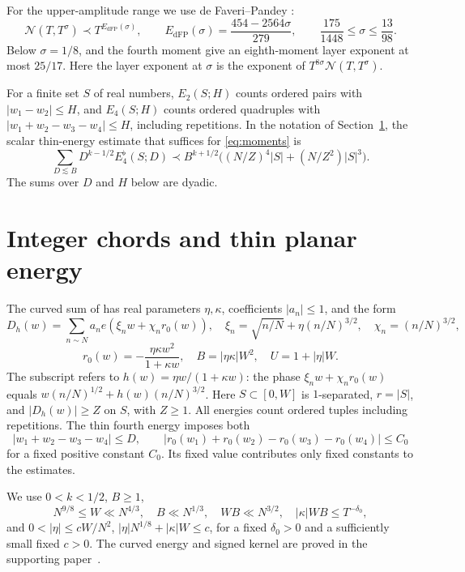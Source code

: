 \documentclass[11pt]{amsart}
\numberwithin{equation}{section}
\newcommand{\cN}{\mathcal N}
\begin{document}
For the upper-amplitude range we use de Faveri--Pandey
\cite[Theorem 9.1 with $k=4$]{dFP}:
\begin{equation}\label{eq:upper}
\cN(T,T^\sigma)\prec T^{E_{\mathrm{dFP}}(\sigma)},\qquad
 E_{\mathrm{dFP}}(\sigma)=\frac{454-2564\sigma}{279},\qquad
 \frac{175}{1448}\le\sigma\le\frac{13}{98}.
\end{equation}
Below $\sigma=1/8$, \cite[Theorem 1.3]{dFP} and the fourth moment give
an eighth-moment layer exponent at most $25/17$. Here the layer exponent
at $\sigma$ is the exponent of $T^{8\sigma}\cN(T,T^\sigma)$.

For a finite set $S$ of real numbers,
$E_2(S;H)$ counts ordered pairs with $|w_1-w_2|\le H$,
and $E_4(S;H)$ counts ordered quadruples with
$|w_1+w_2-w_3-w_4|\le H$, including repetitions.
In the notation of Section~\ref{sec:geometry},
the scalar thin-energy estimate that suffices for \eqref{eq:moments} is
\begin{equation}\label{eq:scalar}
\sum_{D\lesssim B}D^{k-1/2}E_4^\flat(S;D)
 \prec B^{k+1/2}\bigl((N/Z)^4|S|+(N/Z^2)|S|^3\bigr).
\end{equation}
The sums over $D$ and $H$ below are dyadic.

\section{Integer chords and thin planar energy}\label{sec:geometry}

The curved sum of \cite[(\ref*{six-eq:model})]{Weighted} has real
parameters $\eta,\kappa$, coefficients $|a_n|\le1$, and the form
\[
 D_h(w)=\sum_{n\sim N}a_n e(\xi_n w+\chi_n r_0(w)),\quad
 \xi_n=\sqrt{n/N}+\eta(n/N)^{3/2},\quad \chi_n=(n/N)^{3/2},
\]
\[
 r_0(w)=-\frac{\eta\kappa w^2}{1+\kappa w},\quad
 B=|\eta\kappa|W^2,\quad U=1+|\eta|W.
\]
The subscript refers to $h(w)=\eta w/(1+\kappa w)$:
the phase $\xi_nw+\chi_nr_0(w)$ equals
$w(n/N)^{1/2}+h(w)(n/N)^{3/2}$.
Here \(S\subset[0,W]\) is $1$-separated, \(r=|S|\), and
\(|D_h(w)|\ge Z\) on $S$, with $Z\ge1$. All energies count ordered tuples including
repetitions. The thin fourth energy imposes both
\[
 |w_1+w_2-w_3-w_4|\le D,\qquad
 |r_0(w_1)+r_0(w_2)-r_0(w_3)-r_0(w_4)|\le C_0
\]
for a fixed positive constant \(C_0\). Its fixed value contributes only fixed constants to the estimates.

We use \(0<k<1/2\), \(B\ge1\),
\begin{equation}\label{eq:modelrange}
N^{9/8}\le W\ll N^{4/3},\quad B\ll N^{1/3},\quad WB\ll N^{3/2},
 \quad |\kappa|WB\le T^{-\delta_0},
\end{equation}
and $0<|\eta|\le cW/N^2$, $|\eta|N^{1/8}+|\kappa|W\le c$, for a fixed
$\delta_0>0$ and a sufficiently small fixed $c>0$.
The curved energy and signed kernel are proved in the supporting
paper~\cite{Weighted}.
\end{document}
